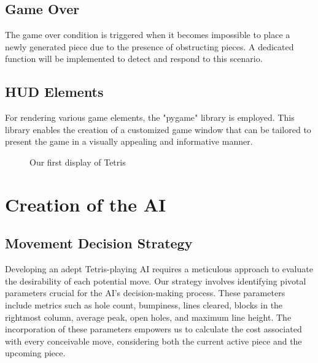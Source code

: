 \documentclass[conference]{IEEEtran}
\begin{document}
\subsection{Game Over}
The game over condition is triggered when it becomes impossible to place a newly generated piece due to the presence of obstructing pieces. A dedicated function will be implemented to detect and respond to this scenario.
\subsection{HUD Elements}
For rendering various game elements, the "pygame"\cite{b4} library is employed. This library enables the creation of a customized game window that can be tailored to present the game in a visually appealing and informative manner.
\begin{figure}[h]
    \centering
    \caption{Our first display of Tetris}
    \label{fig:Display}
\end{figure}

\section*{Creation of the AI}
\subsection{Movement Decision Strategy}
Developing an adept Tetris-playing AI requires a meticulous approach to evaluate the desirability of each potential move. Our strategy involves identifying pivotal parameters crucial for the AI's decision-making process. These parameters include metrics such as hole count, bumpiness, lines cleared, blocks in the rightmost column, average peak, open holes, and maximum line height. The incorporation of these parameters empowers us to calculate the cost associated with every conceivable move, considering both the current active piece and the upcoming piece.
\end{document}
